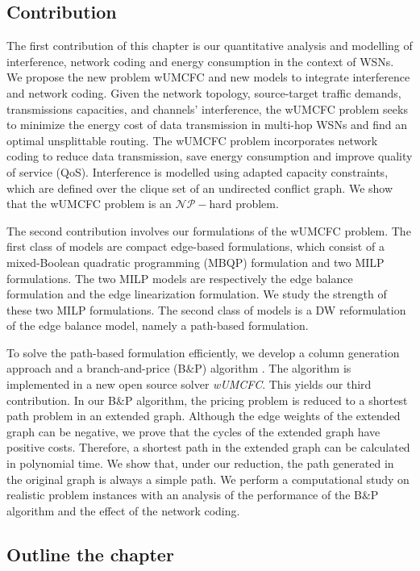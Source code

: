 \subsection{Contribution}
 The first contribution of this chapter is our quantitative analysis and modelling of interference, network coding and energy consumption in the context of WSNs. We propose the new problem wUMCFC and new models to integrate interference and network coding.
Given the network topology, source-target traffic demands, transmissions capacities, and channels' interference, the wUMCFC problem seeks to minimize the energy cost of data transmission in multi-hop WSNs and find an optimal unsplittable routing. The wUMCFC problem incorporates network coding to reduce data transmission, save energy consumption and improve quality of service (QoS). Interference is modelled using adapted capacity constraints, which are defined over the clique set of an undirected conflict graph.
We show that the wUMCFC problem is an $\mathcal{NP}-$hard problem.

 The second contribution involves our formulations of the  wUMCFC problem. The first class of models are compact edge-based formulations, which consist of a mixed-Boolean quadratic programming (MBQP) formulation and two MILP formulations. The two MILP models are respectively the edge balance formulation and the edge linearization formulation. We study the strength of these two MILP formulations.
 The second class of models is a DW reformulation of the edge balance model, namely a path-based formulation.
 
 
To solve the path-based formulation efficiently, we develop a column generation approach and a branch-and-price (B\(\&\)P) algorithm \cite{alvelos2003comparing, barnhart1998branch, gendron2014branch}. The algorithm is implemented in a new open source solver \textit{wUMCFC}. This yields our third contribution. 
In our B\(\&\)P algorithm, the pricing problem is reduced to a shortest path problem in an extended graph.
Although the edge weights of the extended graph can be negative, we prove that the cycles of the extended graph have positive costs. Therefore, a shortest path in the extended graph can be calculated in polynomial time. We show that, under our reduction, the path generated in the original graph is always a simple path.
We perform a computational study on realistic problem instances with an analysis of the performance of the B\(\&\)P algorithm and the effect of the network coding.

\subsection{Outline the chapter}


